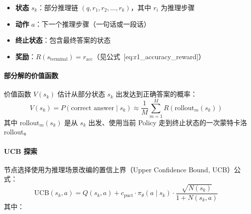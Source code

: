 \begin{itemize}
  \item \textbf{状态} $s_k$：部分推理链 $(q, r_1, r_2, \ldots, r_k)$，其中 $r_i$ 为推理步骤
  \item \textbf{动作} $a$：下一个推理步骤（一句话或一段话）
  \item \textbf{终止状态}：包含最终答案的状态
  \item \textbf{奖励}：$R(s_{\text{terminal}}) = r_{\text{acc}}$（见公式~[eq:r1\_accuracy\_reward]）
\end{itemize}

\paragraph{部分解的价值函数}
\label{value-function-for-partial-solutions}

价值函数 $V(s_k)$ 估计从部分状态 $s_k$ 出发达到正确答案的概率：
\begin{equation}
    V(s_k) = P(\text{correct answer} \mid s_k) \approx \frac{1}{M} \sum_{m=1}^{M} R(\text{rollout}_m(s_k))
\end{equation}
其中 $\text{rollout}_m(s_k)$ 是从 $s_k$ 出发、使用当前 Policy 走到终止状态的一次蒙特卡洛 rollout。

\paragraph{UCB 探索}
\label{ucb-exploration}

节点选择使用为推理场景改编的置信上界（Upper Confidence Bound, UCB）公式：
\begin{equation}
    \text{UCB}(s_k, a) = Q(s_k, a) + c_{\text{puct}} \cdot \pi_\theta(a \mid s_k) \cdot \frac{\sqrt{N(s_k)}}{1 + N(s_k, a)}
\end{equation}
其中：

